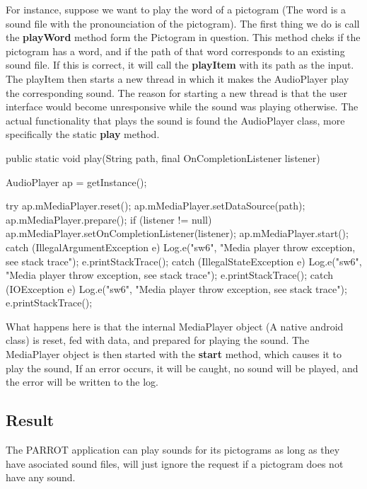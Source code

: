 For instance, suppose we want to play the word of a pictogram (The word is a sound file with the pronounciation of the pictogram). 
The first thing we do is call the \textbf{playWord} method form the Pictogram in question. 
This method cheks if the pictogram has a word, and if the path of that word corresponds to an existing sound file. 
If this is correct, it will call the \textbf{playItem} with its path as the input. 
The playItem then starts a new thread in which it makes the AudioPlayer play the corresponding sound. 
The reason for starting a new thread is that the user interface would become unresponsive while the sound was playing otherwise.\newline
The actual functionality that plays the sound is found the AudioPlayer class, more specifically the static \textbf{play} method.\newline

\begin{source}{}
	public static void play(String path, final OnCompletionListener listener)
	{
		AudioPlayer ap = getInstance();
		 
		try {
			ap.mMediaPlayer.reset();
			ap.mMediaPlayer.setDataSource(path);
			ap.mMediaPlayer.prepare();
			if (listener != null)
				ap.mMediaPlayer.setOnCompletionListener(listener);
			ap.mMediaPlayer.start(); 
		} catch (IllegalArgumentException e) {
			Log.e("sw6", "Media player throw exception, see stack trace");
			e.printStackTrace();
		} catch (IllegalStateException e) {
			Log.e("sw6", "Media player throw exception, see stack trace");
			e.printStackTrace();
		} catch (IOException e) {
			Log.e("sw6", "Media player throw exception, see stack trace");
			e.printStackTrace();
		} 
	}
\end{source}

What happens here is that the internal MediaPlayer object (A native android class) is reset, fed with data, and prepared for playing the sound. The MediaPlayer object is then started with the \textbf{start} method, which causes it to play the sound, If an error occurs, it will be caught, no sound will be played, and the error will be written to the log.\newline

\subsection{Result}
The PARROT application can play sounds for its pictograms as long as they have asociated sound files, will just ignore the request if a pictogram does not have any sound.

